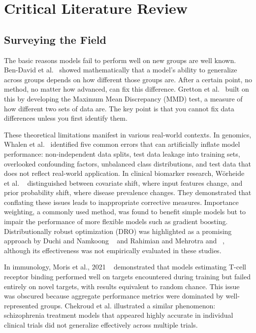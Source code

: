 \section{Critical Literature Review}

\subsection{Surveying the Field}

The basic reasons models fail to perform well on new groups are well known. Ben-David et al.~\cite{bendavid2010theory} showed mathematically that a model's ability to generalize across groups depends on how different those groups are. After a certain point, no method, no matter how advanced, can fix this difference. Gretton et al.~\cite{gretton2012kernel} built on this by developing the Maximum Mean Discrepancy (MMD) test, a measure of how different two sets of data are. The key point is that you cannot fix data differences unless you first identify them.

These theoretical limitations manifest in various real-world contexts. In genomics, Whalen et al.~\cite{whalen2022pitfalls} identified five common errors that can artificially inflate model performance: non-independent data splits, test data leakage into training sets, overlooked confounding factors, unbalanced class distributions, and test data that does not reflect real-world application. In clinical biomarker research, W\"{o}rheide et al. ~\cite{worheide2021shift} distinguished between covariate shift, where input features change, and prior probability shift, where disease prevalence changes. They demonstrated that conflating these issues leads to inappropriate corrective measures. Importance weighting, a commonly used method, was found to benefit simple models but to impair the performance of more flexible models such as gradient boosting. Distributionally robust optimization (DRO) was highlighted as a promising approach by Duchi and Namkoong ~\cite{duchi2018learning} and Rahimian and Mehrotra and ~\cite{rahimian2019dro}, although its effectiveness was not empirically evaluated in these studies.

In immunology, Moris et al., 2021 ~\cite{springer2021unseen} demonstrated that models estimating T-cell receptor binding performed well on targets encountered during training but failed entirely on novel targets, with results equivalent to random chance. This issue was obscured because aggregate performance metrics were dominated by well-represented groups. Chekroud et al.\cite{chekroud2024illusory}
illustrated a similar phenomenon: schizophrenia treatment models that appeared highly accurate in individual clinical trials did not generalize effectively across multiple trials.

